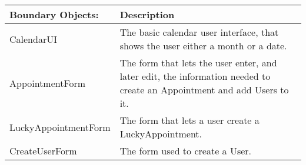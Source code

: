 {\tabulinesep=1.2mm
\begin{tabu}{ | p{6cm} | p{10cm} |}
    \hline
\textbf{Boundary Objects:}	& 		\textbf{Description}\\ \hline
    CalendarUI       		&       The basic calendar user interface, that shows the user either a month or a date.\\\hline
    AppointmentForm  		&       The form that lets the user enter, and later edit, the information needed to create an Appointment and add Users to it.\\\hline
    LuckyAppointmentForm  	&       The form that lets a user create a LuckyAppointment.\\\hline
    CreateUserForm  		&       The form used to create a User.\\\hline
\end{tabu}
}